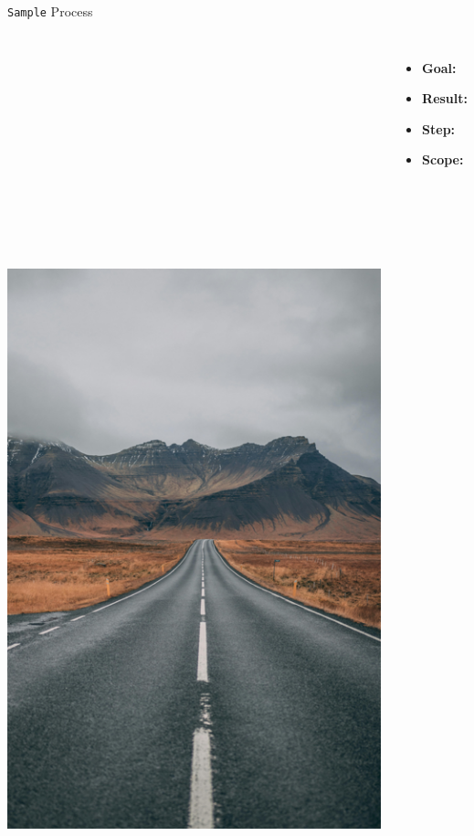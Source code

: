 \documentclass[presentation, aspectratio=169]{beamer}
\begin{document}

\begin{frame}[label=process1]{\texttt{Sample} Process 
  \hyperlink{algo1}{} 
  \hyperlink{pseudocode1}{}
}
	\begin{columns}
		\centering
		\includegraphics[height=1.8\textwidth]{samplev.png}
		\begin{itemize}
			\item \textbf{Goal:}
			\item \textbf{Result:}
			\item \textbf{Step:} 
			\item \textbf{Scope:}
		\end{itemize}
	\end{columns}
	\note{}
\end{frame}
								
\end{document}
